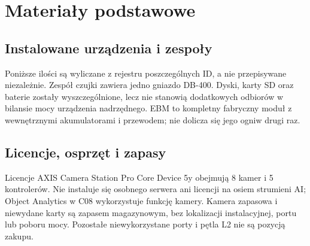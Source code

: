 \section{Materiały podstawowe}
\subsection{Instalowane urządzenia i zespoły}
Poniższe ilości są wyliczane z rejestru poszczególnych ID, a nie przepisywane niezależnie. Zespół czujki zawiera jedno gniazdo DB-400. Dyski, karty SD oraz baterie zostały wyszczególnione, lecz nie stanowią dodatkowych odbiorów w bilansie mocy urządzenia nadrzędnego. EBM to kompletny fabryczny moduł z wewnętrznymi akumulatorami i przewodem; nie dolicza się jego ogniw drugi raz.

\DeviceBom

\subsection{Licencje, osprzęt i zapasy}
Licencje AXIS Camera Station Pro Core Device 5y obejmują 8 kamer i 5 kontrolerów. Nie instaluje się osobnego serwera ani licencji na osiem strumieni AI; Object Analytics w C08 wykorzystuje funkcję kamery. Kamera zapasowa i niewydane karty są zapasem magazynowym, bez lokalizacji instalacyjnej, portu lub poboru mocy. Pozostałe niewykorzystane porty i pętla L2 nie są pozycją zakupu.\cite{S-VMS,S-AOA}

\AccessoryBom

